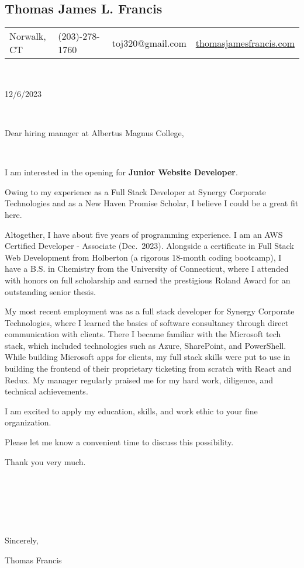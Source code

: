 \documentclass[letterpaper]{article}
\author{}
\date{}
\begin{document}
\hypertarget{thomas-james-l.-francis}{%
\begin{center}
\section{Thomas James L. Francis}
\end{center}
\label{thomas-james-l.-francis}}

\begin{longtable}[]{@{}
  >{\raggedright\arraybackslash}p{}
  >{\raggedright\arraybackslash}p{}
  >{\raggedright\arraybackslash}p{}
  >{\raggedright\arraybackslash}p{}@{}}
\toprule\noalign{}
\endhead
\bottomrule\noalign{}
\endlastfoot
Norwalk, CT & (203)-278-1760 & toj320@gmail.com &
\href{https://thomasjamesfrancis.com}{thomasjamesfrancis.com} \\
\end{longtable}

~

12/6/2023

~

Dear hiring manager at Albertus Magnus College,

~

I am interested in the opening for \textbf{Junior Website Developer}.

Owing to my experience as a Full Stack Developer at Synergy Corporate
Technologies and as a New Haven Promise Scholar, I believe I could be a
great fit here.

Altogether, I have about five years of programming experience. I am an
AWS Certified Developer - Associate (Dec.~2023). Alongside a certificate
in Full Stack Web Development from Holberton (a rigorous 18-month coding
bootcamp), I have a B.S. in Chemistry from the University of
Connecticut, where I attended with honors on full scholarship and earned
the prestigious Roland Award for an outstanding senior thesis.

My most recent employment was as a full stack developer for Synergy
Corporate Technologies, where I learned the basics of software
consultancy through direct communication with clients. There I became
familiar with the Microsoft tech stack, which included technologies such
as Azure, SharePoint, and PowerShell. While building Microsoft apps for
clients, my full stack skills were put to use in building the frontend
of their proprietary ticketing from scratch with React and Redux. My
manager regularly praised me for my hard work, diligence, and technical
achievements.

I am excited to apply my education, skills, and work ethic to your fine
organization.

Please let me know a convenient time to discuss this possibility.

Thank you very much.

~

~

~

Sincerely,

Thomas Francis
\end{document}
